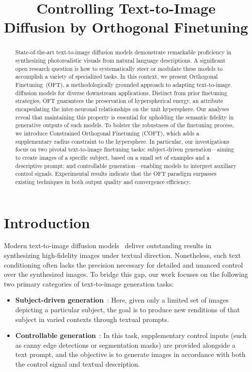 \title{Controlling Text-to-Image Diffusion by Orthogonal Finetuning}

\begin{abstract}
State-of-the-art text-to-image diffusion models demonstrate remarkable proficiency in synthesizing photorealistic visuals from natural language descriptions. A significant open research question is how to systematically steer or modulate these models to accomplish a variety of specialized tasks. In this context, we present Orthogonal Finetuning~(OFT), a methodologically grounded approach to adapting text-to-image diffusion models for diverse downstream applications. Distinct from prior finetuning strategies, OFT guarantees the preservation of hyperspherical energy, an attribute encapsulating the inter-neuronal relationships on the unit hypersphere. Our analyses reveal that maintaining this property is essential for upholding the semantic fidelity in generative outputs of such models. To bolster the robustness of the finetuning process, we introduce Constrained Orthogonal Finetuning (COFT), which adds a supplementary radius constraint to the hypersphere. In particular, our investigations focus on two pivotal text-to-image finetuning tasks: subject-driven generation—aiming to create images of a specific subject, based on a small set of examples and a descriptive prompt; and controllable generation—enabling models to interpret auxiliary control signals. Experimental results indicate that the OFT paradigm surpasses existing techniques in both output quality and convergence efficiency.
\end{abstract}

\section{Introduction}

Modern text-to-image diffusion models~\cite{saharia2022photorealistic, ramesh2022hierarchical, rombach2022high} deliver outstanding results in synthesizing high-fidelity images under textual direction. Nonetheless, such text conditioning often lacks the precision necessary for detailed and nuanced control over the synthesized images. To bridge this gap, our work focuses on the following two primary categories of text-to-image generation tasks:

\begin{itemize}[leftmargin=*,nosep]

    \item \textbf{Subject-driven generation}~\cite{ruiz2023dreambooth}: Here, given only a limited set of images depicting a particular subject, the goal is to produce new renditions of that subject in varied contexts through textual prompts.
    \item \textbf{Controllable generation}~\cite{zhang2023adding, mou2023t2i}: In this task, supplementary control inputs (such as canny edge detections or segmentation masks) are provided alongside a text prompt, and the objective is to generate images in accordance with both the control signal and textual description.
\end{itemize}

